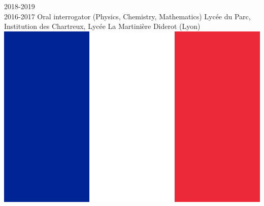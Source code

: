 \documentclass[a4paper]{cvtemplate_en} %
\begin{document}
\begin{cvbody}
\cvitem
	{2018-2019\\ \mbox{}\hfill 2016-2017}
	{}
	{Oral interrogator (Physics, Chemistry, Mathematics)}
	{Lyc\'ee du Parc, Institution des Chartreux, Lyc\'ee La Martinière Diderot (Lyon) \includegraphics[height=0.8\myheight]{fr}}
	{}{}{}
	{}
	{\vspace{5pt}
	}



\end{cvbody}
\end{document}
